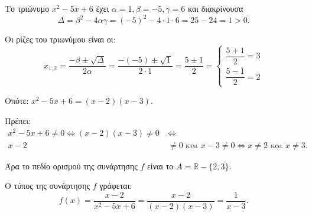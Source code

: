 
\begin{alist}
\item Το τριώνυμο $x^2 - 5x + 6$ έχει $\alpha = 1, \beta = -5, \gamma = 6$ και διακρίνουσα
\[\Delta = \beta^2 - 4\alpha\gamma = (-5)^2 - 4 \cdot 1 \cdot 6 = 25 - 24 = 1 > 0.\]

Οι ρίζες του τριωνύμου είναι οι:
\[x_{1,2} = \dfrac{-\beta \pm \sqrt{\Delta}}{2\alpha} = \dfrac{-(-5) \pm \sqrt{1}}{2 \cdot 1} = \dfrac{5 \pm 1}{2} = \begin{cases} \dfrac{5 + 1}{2} = 3 \\[2ex] \dfrac{5 - 1}{2} = 2 \end{cases}\]

Οπότε:
$x^2 - 5x + 6 = (x - 2)(x - 3)$.

\item
\begin{rlist}
\item Πρέπει:
\begin{align*}
x^2 - 5x + 6 \ne 0 \Leftrightarrow (x - 2)(x - 3) \ne 0 \ &\Leftrightarrow \\
x - 2 &\ne 0 \text{ και } x - 3 \ne 0 \Leftrightarrow x \ne 2 \text{ και } x \ne 3.
\end{align*}

Άρα το πεδίο ορισμού της συνάρτησης $f$ είναι το $A = \mathbb{R} - \{2, 3\}$.

\item Ο τύπος της συνάρτησης $f$ γράφεται:
\[f(x) = \dfrac{x - 2}{x^2 - 5x + 6} = \dfrac{x - 2}{(x - 2)(x - 3)} = \dfrac{1}{x - 3}.\]
\end{rlist}
\end{alist}

